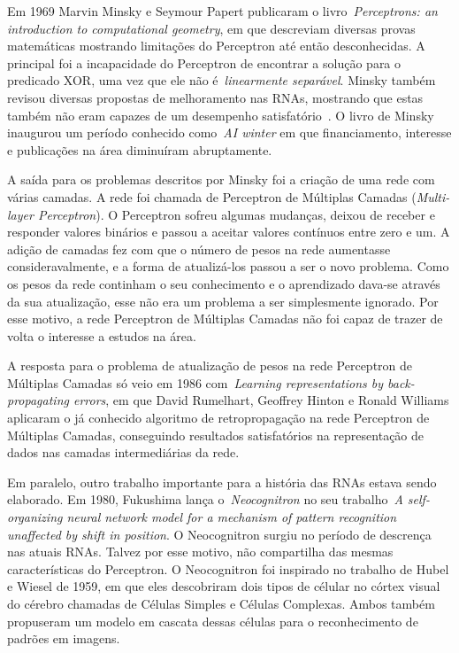 Em 1969 Marvin Minsky e Seymour Papert publicaram o livro~\emph{Perceptrons: an introduction to computational geometry}, em que descreviam diversas provas matemáticas mostrando limitações do Perceptron até então desconhecidas. A principal foi a incapacidade do Perceptron de encontrar a solução para o predicado XOR, uma vez que ele não é~\emph{linearmente separável}.  Minsky também revisou diversas propostas de melhoramento nas RNAs, mostrando que estas também não eram capazes de um desempenho satisfatório~\citep{Yadav2015}. O livro de Minsky inaugurou um período conhecido como~\emph{AI winter} em que financiamento, interesse e publicações na área diminuíram abruptamente.

A saída para os problemas descritos por Minsky foi a criação de uma rede com várias camadas. A rede foi chamada de Perceptron de Múltiplas Camadas (\emph{Multi-layer Perceptron}). O Perceptron sofreu algumas mudanças, deixou de receber e responder valores binários e passou a aceitar valores contínuos entre zero e um. A adição de camadas fez com que o número de pesos na rede aumentasse consideravalmente, e a forma de atualizá-los passou a ser o novo problema. Como os pesos da rede continham o seu conhecimento e o aprendizado dava-se através da sua atualização, esse não era um problema a ser simplesmente ignorado. Por esse motivo, a rede Perceptron de Múltiplas Camadas não foi capaz de trazer de volta o interesse a estudos na área.

A resposta para o problema de atualização de pesos na rede Perceptron de Múltiplas Camadas só veio em 1986 com~\emph{Learning representations by back-propagating errors}, em que David Rumelhart, Geoffrey Hinton e Ronald Williams aplicaram o já conhecido algoritmo de retropropagação na rede Perceptron de Múltiplas Camadas, conseguindo resultados satisfatórios na representação de dados nas camadas intermediárias da rede.

Em paralelo, outro trabalho importante para a história das RNAs estava sendo elaborado. Em 1980, Fukushima lança o~\emph{Neocognitron} no seu trabalho~\emph{A self-organizing neural network model for a mechanism of pattern recognition unaffected by shift in position}. O Neocognitron surgiu no período de descrença nas atuais RNAs. Talvez por esse motivo, não compartilha das mesmas características do Perceptron. O Neocognitron foi inspirado no trabalho de Hubel e Wiesel de 1959, em que eles descobriram dois tipos de célular no córtex visual do cérebro chamadas de Células Simples e Células Complexas. Ambos também propuseram um modelo em cascata dessas células para o reconhecimento de padrões em imagens. 

